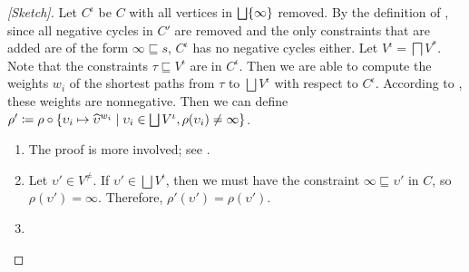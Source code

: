 \begin{proof}[{[Sketch]}]
Let $C^\iota$ be $C$ with all vertices in $\bigsqcup \{\infty\}$ removed.
By the definition of \RecCheck, since all negative cycles in $C'$ are removed and the only constraints that are added are of the form $\infty \sqsubseteq s$,
$C^\iota$ has no negative cycles either.
Let $V^\iota = \bigsqcap V^*$.
Note that the constraints $\tau \sqsubseteq V^\iota$ are in $C^\iota$.
Then we are able to compute the weights $w_i$ of the shortest paths from $\tau$ to $\bigsqcup V^\iota$ with respect to $C^\iota$.
According to \citet{f-hat}, these weights are nonnegative.
Then we can define $\rho' \coloneqq \rho \circ \{\upsilon_i \mapsto \widehat{\upsilon}^{w_i} \mid \upsilon_i \in \bigsqcup V^\iota, \rho(\upsilon_i) \neq \infty\}$.

\begin{enumerate}
  \item The proof is more involved; see \citet{f-hat}.
  \item Let $\upsilon' \in V^\neq$. If $\upsilon' \in \bigsqcup V^\iota$, then we must have the constraint $\infty \sqsubseteq \upsilon'$ in $C$, so $\rho(\upsilon') = \infty$. Therefore, $\rho'(\upsilon') = \rho(\upsilon')$.
  \item 
\end{enumerate}
\end{proof}

